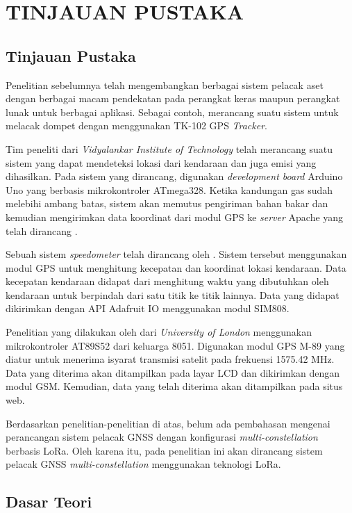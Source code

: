 \chapter{TINJAUAN PUSTAKA}

\section{Tinjauan Pustaka}
Penelitian sebelumnya telah mengembangkan berbagai sistem pelacak aset dengan berbagai macam pendekatan pada perangkat keras maupun perangkat lunak untuk berbagai aplikasi. Sebagai contoh, \cite{Ekhsan2022} merancang suatu sistem untuk melacak dompet dengan menggunakan TK-102 GPS \textit{Tracker}.

Tim peneliti dari \textit{Vidyalankar Institute of Technology} telah merancang suatu sistem yang dapat mendeteksi lokasi dari kendaraan dan juga emisi  yang dihasilkan. Pada sistem yang dirancang, digunakan \textit{development board} Arduino Uno yang berbasis mikrokontroler ATmega328. Ketika kandungan gas  sudah melebihi ambang batas, sistem akan memutus pengiriman bahan bakar dan kemudian mengirimkan data koordinat dari modul GPS ke \textit{server} Apache yang telah dirancang \cite{Asha2022}.

Sebuah sistem \textit{speedometer} telah dirancang oleh \cite{Najmurrokhman2021}. Sistem tersebut menggunakan modul GPS untuk menghitung kecepatan dan koordinat lokasi kendaraan. Data kecepatan kendaraan didapat dari menghitung waktu yang dibutuhkan oleh kendaraan untuk berpindah dari satu titik ke titik lainnya. Data yang didapat dikirimkan dengan API Adafruit IO menggunakan modul SIM808.

Penelitian yang dilakukan oleh \cite{Mukhtar2015} dari \textit{University of London} menggunakan mikrokontroler AT89S52 dari keluarga 8051. Digunakan modul GPS M-89 yang diatur untuk menerima isyarat transmisi satelit pada frekuensi 1575.42 MHz. Data yang diterima akan ditampilkan pada layar LCD dan dikirimkan dengan modul GSM. Kemudian, data yang telah diterima akan ditampilkan pada situs web.

Berdasarkan penelitian-penelitian di atas, belum ada pembahasan mengenai perancangan sistem pelacak GNSS dengan konfigurasi \textit{multi-constellation} berbasis LoRa. Oleh karena itu, pada penelitian ini akan dirancang sistem pelacak GNSS \textit{multi-constellation} menggunakan teknologi LoRa.

\section{Dasar Teori}
